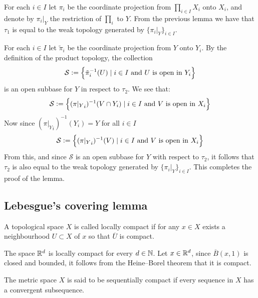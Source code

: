\documentclass[11pt,a4paper]{article}
\begin{document}
\begin{proofof}{}
  For each $i \in I$ let $\pi_i$ be the coordinate projection from 
  $\prod_{i \in I}{X_i}$ onto $X_i$, and denote by $\pi_i\vert_Y$ the 
  restriction of $\prod_i$ to $Y$. From the previous lemma we have
  that $\tau_1$ is equal to the weak topology generated by 
  $\{\pi_i \vert_Y\}_{i \in I}$. 
  
  For each $i \in I$ let $\tilde{\pi}_i$ be the coordinate projection from 
  $Y$ onto $Y_i$. By the definition of the product topology, the collection
  \[
    \mathcal{S} := \left\{\tilde{\pi}_{i}^{-1}(U) \mid
    \text{$i \in I$ and $U$ is open in $Y_i$}\right\}
  \]
  is an open subbase for $Y$ in respect to $\tau_2$. We see that:
  \[
    \mathcal{S} := \left\{({\pi \vert_Y}_{i})^{-1}(V \cap Y_i) \mid
    \text{$i \in I$ and $V$ is open in $X_i$}\right\}
  \]
  Now since $({\pi \vert_Y}_{i})^{-1}(Y_i) = Y$ for all $i \in I$
  \[
    \mathcal{S} := \left\{({\pi \vert_Y}_{i})^{-1}(V) \mid
    \text{$i \in I$ and $V$ is open in $X_i$}\right\}
  \]
  From this, and since $\mathcal{S}$ is an open subbase for $Y$ with 
  respect to $\tau_2$, it follows that $\tau_2$ is also equal to the weak 
  topology generated by $\{\pi_i \vert_Y\}_{i \in I}$. This completes the
  proof of the lemma.
\end{proofof}

\subsection{Lebesgue’s covering lemma}

\begin{definition}
  A topological space $X$ is called locally compact if for
  any $x \in X$ exists a neighbourhood $U \subset X$ of $x$ so that
  $\overline{U}$ is compact.
\end{definition}

\begin{example}
  The space $\mathbb{R}^d$ is locally compact for every $d \in \mathbb{N}$. 
  Let $x \in \mathbb{R}^d$, since $\overline B(x,1)$ is closed and bounded,
  it follows from the Heine--Borel theorem that it is compact.
\end{example}

\begin{definition}
  The metric space $X$ is said to be sequentially compact
  if every sequence in $X$ has a convergent subsequence.
\end{definition}
\end{document}
